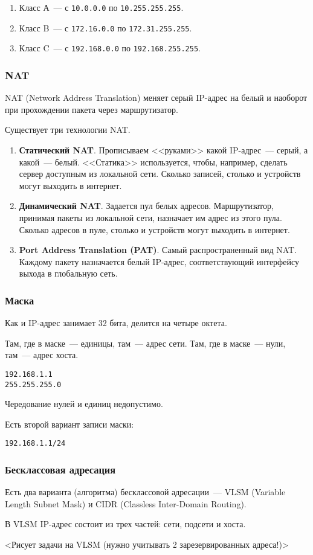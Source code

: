 \begin{enumerate}
    \item Класс А~--- с \texttt{10.0.0.0} по \texttt{10.255.255.255}.
    \item Класс B~--- с \texttt{172.16.0.0} по \texttt{172.31.255.255}.
    \item Класс C~--- с \texttt{192.168.0.0} по \texttt{192.168.255.255}.
\end{enumerate}

\subsubsection{NAT}

NAT (Network Address Translation) меняет серый IP-адрес на белый и наоборот при
прохождении пакета через маршрутизатор.

Существует три технологии NAT.

\begin{enumerate}
    \item \textbf{Статический NAT}. Прописываем <<руками>> какой IP-адрес~--- серый, а какой~--- белый. <<Статика>> используется, чтобы, например, сделать сервер доступным из локальной сети. Сколько записей, столько и устройств могут выходить в интернет.
    \item \textbf{Динамический NAT}. Задается пул белых адресов. Маршрутизатор, принимая пакеты из локальной сети, назначает им адрес из этого пула. Сколько адресов в пуле, столько и устройств могут выходить в интернет.
    \item \textbf{Port Address Translation (PAT)}. Самый распространенный вид NAT. Каждому пакету назначается белый IP-адрес, соответствующий интерфейсу выхода в глобальную сеть.
\end{enumerate}

\subsubsection{Маска}

Как и IP-адрес занимает 32 бита, делится на четыре октета.

Там, где в маске~--- единицы, там~--- адрес сети. Там, где в маске~--- нули, там~--- адрес хоста.
%
\begin{center}
    \texttt{192.168.\phantom{11}1.1}\\
    \texttt{255.255.255.0}
\end{center}
%
Чередование нулей и единиц недопустимо.

Есть второй вариант записи маски:
%
\begin{center}
    \texttt{192.168.1.1/24}
\end{center}
%
\subsubsection{Бесклассовая адресация}

Есть два варианта (алгоритма) бесклассовой адресации~--- VLSM (Variable Length Subnet Mask) и CIDR (Classless Inter-Domain Routing).

В VLSM IP-адрес состоит из трех частей: сети, подсети и хоста.

<Рисует задачи на VLSM (нужно учитывать 2 зарезервированных адреса!)>